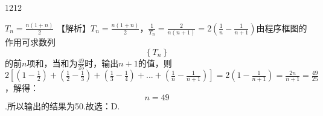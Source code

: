 1212

${{T}_{n}}=\frac{n\left( 1+n \right)}{2}$
【解析】${{T}_{n}}=\frac{n\left( 1+n \right)}{2}$，$\frac{1}{{{T}_{n}}}=\frac{2}{n\left( n+1 \right)}=2\left( \frac{1}{n}-\frac{1}{n+1} \right)$由程序框图的作用可求数列
\[\left\{ {{T}_{n}} \right\}\]
的前$n$项和，当和为$\frac{49}{25}$时，输出$n+1$的值，则$2\left[ \left( 1-\frac{1}{2} \right)+\left( \frac{1}{2}-\frac{1}{3} \right)+\left( \frac{1}{3}-\frac{1}{4} \right)+...+\left( \frac{1}{n}-\frac{1}{n+1} \right) \right]=2\left( 1-\frac{1}{n+1} \right)=\frac{2n}{n+1}=\frac{49}{25}$，解得：\[n=49\].所以输出的结果为50.故选：D.